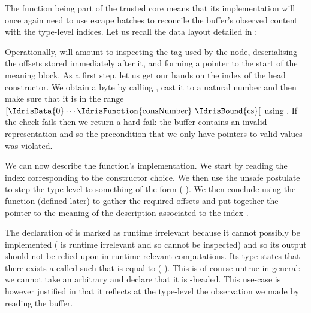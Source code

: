 The function  being part of the trusted
core means that its implementation will once again need to
use escape hatches to reconcile the buffer's observed content
with the type-level indices.
%
Let us recall the data layout detailed in :
\begin{center}

\end{center}
Operationally, 
will amount to inspecting the tag used by the node,
deserialising the offsets stored immediately after it,
and forming a pointer to the start of the meaning block.
%
As a first step, let us get our hands on the index of the head constructor.
We obtain a byte by calling , cast it to a
natural number and then make sure that it is in the range
$[\text{\IdrisData{0}} \cdots \text{\IdrisFunction{consNumber} \IdrisBound{cs}}[$ using
. If the check fails then we return
a hard fail: the buffer contains an invalid representation
and so the precondition that we only have pointers to valid
values was violated.

We can now describe the  function's implementation.
We start by reading the index 
corresponding to the constructor choice.
%
We then use the unsafe  postulate to step the
type-level  to something of the form
( \IdrisData{\#} ).
%
We then conclude using the  function
(defined later) to gather the required offsets and put together
the pointer to the meaning of the description associated to the
index .


The declaration of  is marked as runtime
irrelevant because it cannot possibly be implemented
( is runtime irrelevant and so cannot be inspected)
and so its output should not be relied upon in runtime-relevant
computations.
%
Its type states that there exists a  called
 such that  is equal to
( \IdrisData{\#} ).
%
This is of course untrue in general: we cannot take an arbitrary
 and declare that it is -headed.
This use-case is however justified in that it reflects at the
type-level the observation we made by reading the buffer.

